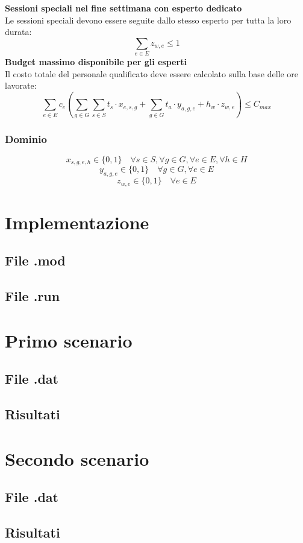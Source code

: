 \documentclass[12pt]{article}
\begin{document}
    \textbf{Sessioni speciali nel fine settimana con esperto dedicato}\\
    Le sessioni speciali devono essere seguite dallo stesso esperto per tutta la loro durata:
    \begin{equation}
        \sum_{e \in E} z_{w,e} \leq 1
    \end{equation}
    \textbf{Budget massimo disponibile per gli esperti}\\
    Il costo totale del personale qualificato deve essere calcolato sulla base delle ore lavorate:
    \begin{equation}
        \sum_{e \in E} c_e (\sum_{g \in G}\sum_{s \in S} t_s \cdot x_{e,s,g} + \sum_{g \in G} t_a \cdot y_{a,g,e} + h_w \cdot z_{w,e}) \leq C_{max}
    \end{equation}
    \subsubsection{Dominio}
    \begin{equation}
        x_{s,g,e,h} \in \{0,1\} \quad \forall s \in S, \forall g \in G, \forall e \in E, \forall h \in H
    \end{equation}
    \begin{equation}
        y_{a,g,e} \in \{0,1\} \quad \forall g \in G, \forall e \in E
    \end{equation}
    \begin{equation}
        z_{w,e} \in \{0,1\} \quad \forall e \in E
    \end{equation}
    \section{Implementazione}
    \subsection{File .mod}
    \subsection{File .run}
    \section{Primo scenario}
    \subsection{File .dat}
    \subsection{Risultati}
    \section{Secondo scenario}
    \subsection{File .dat}
    \subsection{Risultati}
\end{document}
